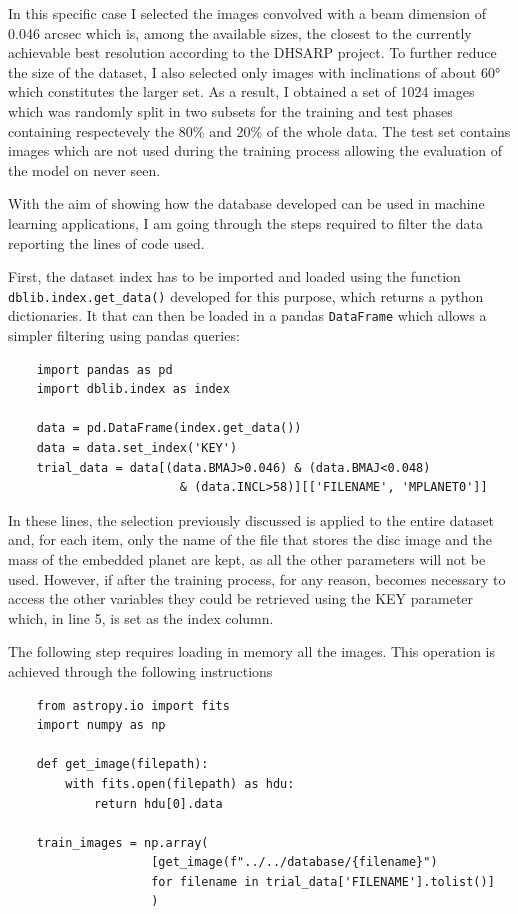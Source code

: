 \documentclass[a4paper,10pt]{report}
\begin{document}
In this specific case I selected the images convolved with a beam dimension of 0.046 arcsec which is,
among the available sizes, the closest to the currently achievable best resolution according to the DHSARP project.
To further reduce the size of the dataset, I also selected only images with inclinations of about
60° which constitutes the larger set.
As a result, I obtained a set of 1024 images which was randomly split in two subsets for the training and
test phases containing respectevely the 80\% and 20\% of the whole data.
The test set contains images which are not used during the training process allowing the evaluation
of the model on never seen.

With the aim of showing how the database developed can be used in machine learning applications,
I am going through the steps required to filter the data reporting the lines of code used.

First, the dataset index has to be imported and loaded using 
the function \lstinline{dblib.index.get_data()} 
developed for this purpose, which returns
a python dictionaries. It that can then be loaded in a pandas \lstinline{DataFrame}
which allows a simpler filtering using pandas queries:

\begin{lstlisting}
    import pandas as pd
    import dblib.index as index

    data = pd.DataFrame(index.get_data())
    data = data.set_index('KEY')
    trial_data = data[(data.BMAJ>0.046) & (data.BMAJ<0.048)
                        & (data.INCL>58)][['FILENAME', 'MPLANET0']]
\end{lstlisting}

In these lines, the selection previously discussed is applied to the entire dataset and,
for each item, only the name of the file that stores the disc image and the mass of the embedded planet are kept, as
all the other parameters will not be used. However, if after the training process, for any reason, becomes necessary
to access the other variables they could be retrieved using the KEY parameter which, in line 5, is set as 
the index column.

The following step requires loading in memory all the images. This operation is achieved through the following
instructions

\begin{lstlisting}
    from astropy.io import fits
    import numpy as np

    def get_image(filepath):
        with fits.open(filepath) as hdu:
            return hdu[0].data
    
    train_images = np.array(
                    [get_image(f"../../database/{filename}") 
                    for filename in trial_data['FILENAME'].tolist()]
                    )
\end{lstlisting}
\end{document}
